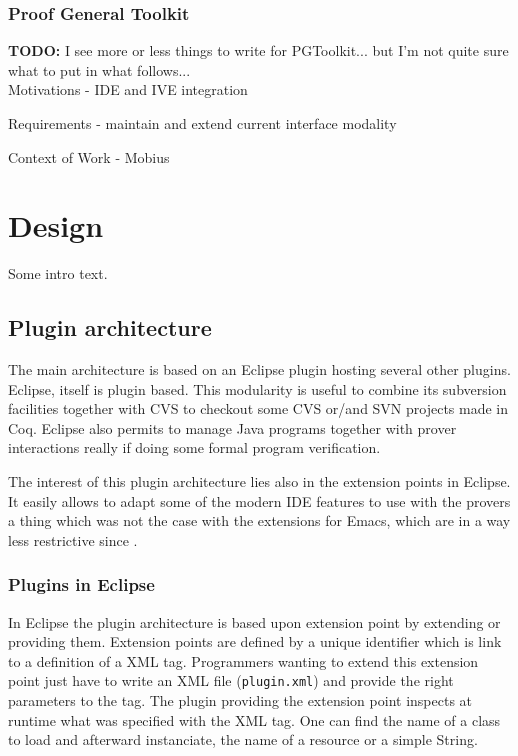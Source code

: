 \documentclass{entcs}
\newcommand{\todo}{\textbf{TODO: }}
\begin{document}
\subsubsection{Proof General Toolkit}
\label{subsubsec:proof-gener-toolk}

\todo{I see more or less things to write for PGToolkit... but I'm not quite
sure what to put in what follows...}\\
Motivations - IDE and IVE integration

Requirements - maintain and extend current interface modality

Context of Work - Mobius

\section{Design}
\label{sec:design}

Some intro text.

\subsection{Plugin architecture}
\label{subsec:plugin-architecture}

The main architecture is based on an Eclipse plugin hosting several other
plugins. Eclipse, itself is plugin based. This modularity is useful to 
combine its subversion facilities together with CVS to checkout some 
CVS or/and SVN projects made in Coq. Eclipse also permits to manage 
Java programs together with prover interactions really 
if doing some formal program verification.

The interest of this plugin architecture lies also in the extension points 
 in Eclipse. It easily allows to adapt some of the modern 
IDE features to use with the provers a thing which was not the case
with the extensions for Emacs, which are in a way less restrictive
since .

\subsubsection{Plugins in Eclipse}
\label{subsubsec:plugins-eclipse}

In Eclipse the plugin architecture is based upon extension point by
extending or providing them. 
Extension points are defined by a unique identifier which is link
to a definition of a XML tag. Programmers wanting to extend
this extension point just have to write an XML file ({\tt plugin.xml}) 
and provide the right parameters to the tag.
The plugin providing the extension point inspects at runtime what was 
specified with the XML tag. One can find the name of a class to load
and afterward instanciate, the name of a resource or a simple String.
\end{document}

